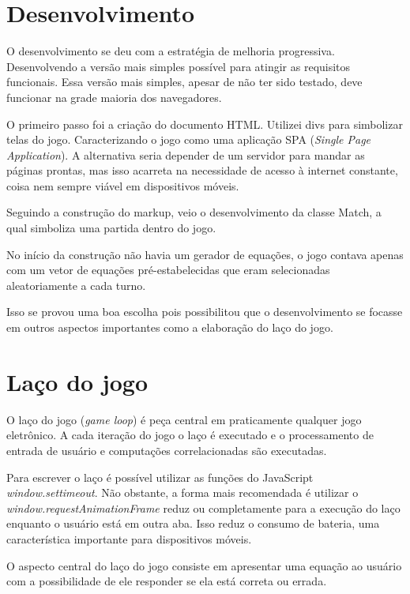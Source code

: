 \begin{draft}
\section{Desenvolvimento}

O desenvolvimento se deu com a estratégia de melhoria progressiva.
Desenvolvendo a versão mais simples possível para atingir as
requisitos funcionais. Essa versão mais simples, apesar de não ter
sido testado, deve funcionar na grade maioria dos navegadores.

O primeiro passo foi a criação do documento HTML. Utilizei divs
para simbolizar telas do jogo. Caracterizando o jogo como uma
aplicação SPA (\textit{Single Page Application}).  A alternativa
seria depender de um servidor para mandar as páginas prontas,
mas isso acarreta na necessidade de acesso à internet constante,
coisa nem sempre viável em dispositivos móveis.

Seguindo a construção do markup, veio o desenvolvimento da 
classe Match, a qual simboliza uma partida dentro do jogo.

No início da construção não  havia um gerador de equações, o jogo
contava apenas com um vetor de equações pré-estabelecidas que
eram selecionadas aleatoriamente a cada turno.

Isso se provou uma boa escolha pois possibilitou que o desenvolvimento
se focasse em outros aspectos importantes como a elaboração do laço do jogo.

\section{Laço do jogo}

O laço do jogo (\textit{game loop}) é peça central em praticamente
qualquer jogo eletrônico. A cada iteração do jogo o laço é
executado e o processamento de entrada de usuário e computações
correlacionadas são executadas.

Para escrever o laço é possível utilizar as funções do JavaScript
\textit{window.settimeout}. Não obstante, a forma mais recomendada é
utilizar o \textit{window.requestAnimationFrame} reduz ou completamente
para a execução do laço enquanto o usuário está em outra aba.
Isso reduz o consumo de bateria, uma característica importante para
dispositivos móveis.

O aspecto central do laço do jogo consiste em apresentar uma equação
ao usuário com a possibilidade de ele responder se ela está correta ou
errada.


\end{draft}
